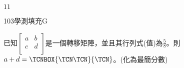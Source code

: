 \begin{QUESTIONS}
\begin{QUESTION}
\begin{QBODY}
        \end{QBODY}
        \begin{QFROMS}
        \end{QFROMS}
        \begin{QTAGS}\end{QTAGS}
        \begin{QANS}
            $11$
        \end{QANS}
        \begin{QSOLLIST}
        \end{QSOLLIST}
        \begin{QEMPTYSPACE}
        \end{QEMPTYSPACE}
    \end{QUESTION}
    \begin{QUESTION}
        \begin{ExamInfo}{103}{學測}{填充}{G}
        \end{ExamInfo}
        \begin{ExamAnsRateInfo}{35}{76}{25}{4}
        \end{ExamAnsRateInfo}
        \begin{QBODY}
		已知$\left[ \begin{matrix}
   a & b  \\
   c & d  \\
\end{matrix} \right]$是一個轉移矩陣，並且其行列式(值)為$\frac{5}{8}$。則$a+d=\TCNBOX{\TCN\TCN}{\TCN}$。(化為最簡分數)


\end{QBODY}
\end{QUESTION}
\end{QUESTIONS}
